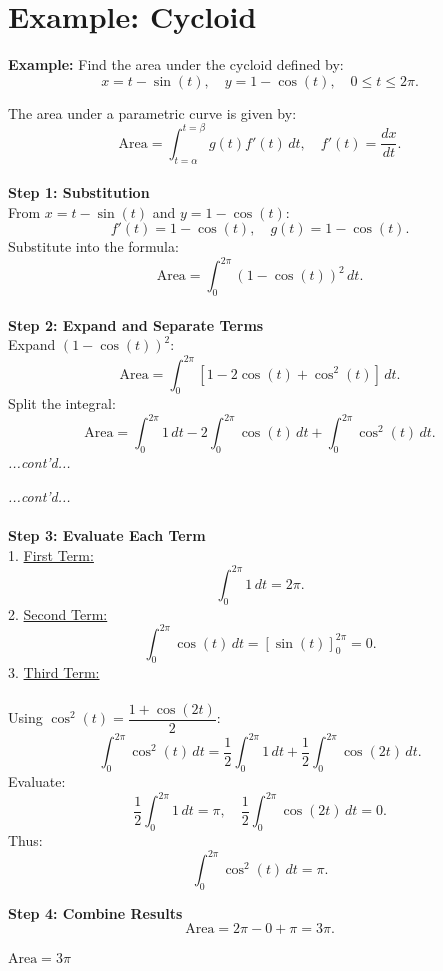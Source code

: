 \documentclass{article}
\begin{document}
\section*{Example: Cycloid}
\begin{examplebox}
\textbf{Example:} Find the area under the cycloid defined by:
\[
    x = t - \sin(t), \quad y = 1 - \cos(t), \quad 0 \leq t \leq 2\pi.
\]

\begin{solutionbox}
The area under a parametric curve is given by:
\[
    \text{Area} = \int_{t=\alpha}^{t=\beta} g(t) f'(t) \, dt, \quad f'(t) = \frac{dx}{dt}.
\]
\\
\textbf{Step 1: Substitution} \\
From \( x = t - \sin(t) \) and \( y = 1 - \cos(t) \):  
\[
    f'(t) = 1 - \cos(t), \quad g(t) = 1 - \cos(t).
\]
Substitute into the formula:
\[
    \text{Area} = \int_{0}^{2\pi} (1 - \cos(t))^2 \, dt.
\]
\\
\textbf{Step 2: Expand and Separate Terms} \\
Expand \( (1 - \cos(t))^2 \):
\[
    \text{Area} = \int_{0}^{2\pi} [1 - 2\cos(t) + \cos^2(t)] \, dt.
\]
Split the integral:
\[
    \text{Area} = \int_{0}^{2\pi} 1 \, dt - 2\int_{0}^{2\pi} \cos(t) \, dt + \int_{0}^{2\pi} \cos^2(t) \, dt.
\]
\textit{...cont'd...}
\end{solutionbox}
\end{examplebox}
\begin{examplebox}
\begin{solutionbox}
\textit{...cont'd...} \\
\\
\textbf{Step 3: Evaluate Each Term} \\
1. \underline{First Term:}  
\[
    \int_{0}^{2\pi} 1 \, dt = 2\pi.
\]  
2. \underline{Second Term:}  
\[
    \int_{0}^{2\pi} \cos(t) \, dt = [\sin(t)]_{0}^{2\pi} = 0.
\]  
3. \underline{Third Term:} \\
\\
Using \( \cos^2(t) = \dfrac{1 + \cos(2t)}{2} \):  
\[
    \int_{0}^{2\pi} \cos^2(t) \, dt = \frac{1}{2} \int_{0}^{2\pi} 1 \, dt + \frac{1}{2} \int_{0}^{2\pi} \cos(2t) \, dt.
\]
Evaluate:  
\[
    \frac{1}{2} \int_{0}^{2\pi} 1 \, dt = \pi, \quad \frac{1}{2} \int_{0}^{2\pi} \cos(2t) \, dt = 0.
\]
Thus:
\[
    \int_{0}^{2\pi} \cos^2(t) \, dt = \pi.
\]

\textbf{Step 4: Combine Results}  
\[
    \text{Area} = 2\pi - 0 + \pi = 3\pi.
\]

\begin{answerbox}
\( \text{Area} = 3\pi \) 
\end{answerbox}

\end{solutionbox}
\end{examplebox}
\end{document}
